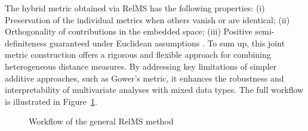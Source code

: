 The hybrid metric obtained via RelMS has the following properties: (i) Preservation of the individual metrics when others vanish or are identical; (ii) Orthogonality of contributions in the embedded space; (iii) Positive semi-definiteness guaranteed under Euclidean assumptions \citep{albarran2015profile}. To sum up, this joint metric construction offers a rigorous and flexible approach for combining heterogeneous distance measures. By addressing key limitations of simpler additive approaches, such as Gower's metric, it enhances the robustness and interpretability of multivariate analyses with mixed data types. The full workflow is illustrated in Figure~\ref{fig:relms-workflow-general-weighted}.

\begin{figure}[htbp]
\centering
\caption{Workflow of the general RelMS method}
\label{fig:relms-workflow-general-weighted}

\vspace{0.5em}
\end{figure}

